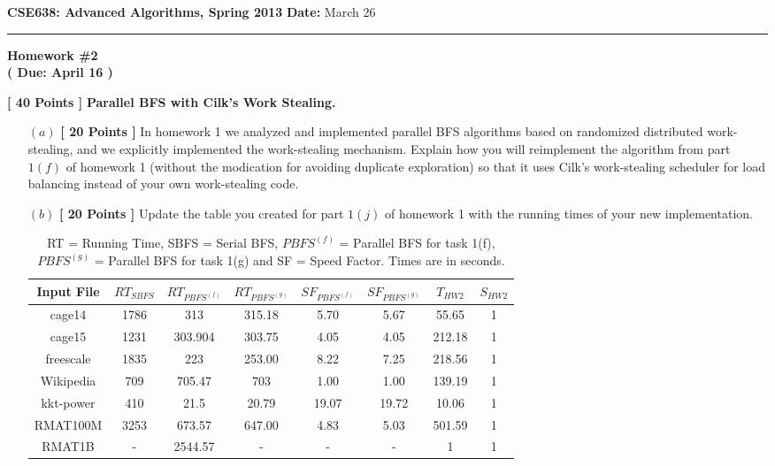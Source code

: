 \documentclass[11pt]{article}
\def\para#1{\vspace{0.2cm}\noindent{\bf{#1.}}}
\newcommand{\headings}[3]{{\large
{\bf CSE638: Advanced Algorithms, Spring 2013} \hfill {{\bf Date:} #1}\\
\rule[0.01in]{\textwidth}{0.025in}}
\begin{center} {{\bf\huge{Homework \##2}}\\{\bf( Due: #3 )}} \end{center}
}
\begin{document}
\headings{March 26}{2}{April 16}
\newcommand{\lecnum}{5}  %




\para{Task 1} {\bf{[ 40 Points ]}} {\bf Parallel BFS with Cilk's Work Stealing.}
%
 \begin{itemize}

 \item[$(a)$] {\bf{[ 20 Points ]}} In homework 1 we analyzed and implemented
parallel BFS algorithms based on randomized distributed work-stealing,
and we explicitly implemented the work-stealing mechanism. Explain how
you will reimplement the algorithm from part $1(f)$ of homework 1
(without the modication for avoiding duplicate exploration) so
that it uses Cilk's work-stealing scheduler for load balancing
instead of your own work-stealing code. 

 \item[$(b)$] {\bf{[ 20 Points ]}} Update the table you created
for part $1(j)$ of homework 1 with the running times of your
new implementation.

\begin {table}[H]
\begin{center}
    \begin{tabular}{ | c | c | c | c | c | c | c | c | }
    \hline
    Input File & $RT_{SBFS}$ & $RT_{PBFS^{(f)}}$ & $RT_{PBFS^{(g)}}$ & $SF_{PBFS^{(f)}}$ & $SF_{PBFS^{(g)}}$ & $T_{HW2}$ & $S_{HW2}$\\ \hline
    cage14 & 1786 & 313 & 315.18 & 5.70 & 5.67 & 55.65 & 1 \\ \hline
    cage15 & 1231 & 303.904 & 303.75 & 4.05 & 4.05 & 212.18 & 1 \\ \hline
    freescale & 1835 & 223 & 253.00 & 8.22 & 7.25 & 218.56 & 1 \\ \hline
	Wikipedia & 709 & 705.47 & 703 & 1.00 & 1.00 & 139.19 & 1 \\ \hline
    kkt-power & 410 & 21.5 & 20.79 & 19.07 & 19.72 & 10.06 & 1 \\ \hline
    RMAT100M & 3253 & 673.57 & 647.00 & 4.83 & 5.03 & 501.59 & 1 \\ \hline
    RMAT1B & - & 2544.57 & - & - & - & 1 & 1 \\ \hline
        
    \end{tabular}
    \caption {RT = Running Time, SBFS = Serial BFS, $PBFS^{(f)}$ = Parallel BFS for task 1(f), $PBFS^{(g)}$ = Parallel BFS for task 1(g) and SF = Speed Factor. Times are in seconds.}
\end{center}
\end {table}


 \end{itemize}
\end{document}
